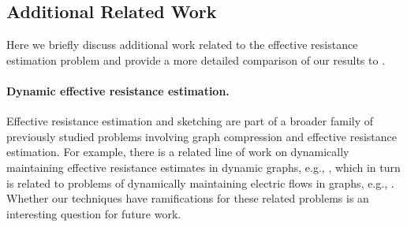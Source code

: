 \subsection{Additional Related Work}\label{sec:additional_related_work}

Here we briefly discuss additional work related to the effective resistance estimation problem and provide a more detailed comparison of our results to \cite{li2022new}. 

\paragraph{Dynamic effective resistance estimation.}{ Effective resistance estimation and sketching are part of a broader family of previously studied problems involving graph compression and effective resistance estimation. For example, there is a related line of work on dynamically maintaining effective resistance  estimates in dynamic graphs, e.g., \cite{durfee2017sampling, goranci2018dynamic}, which in turn is related to problems of dynamically maintaining electric flows in graphs, e.g., \cite{maxflow,BrandGJLLPS22}. Whether our techniques have ramifications for these related problems is an interesting question for future work. 
}

